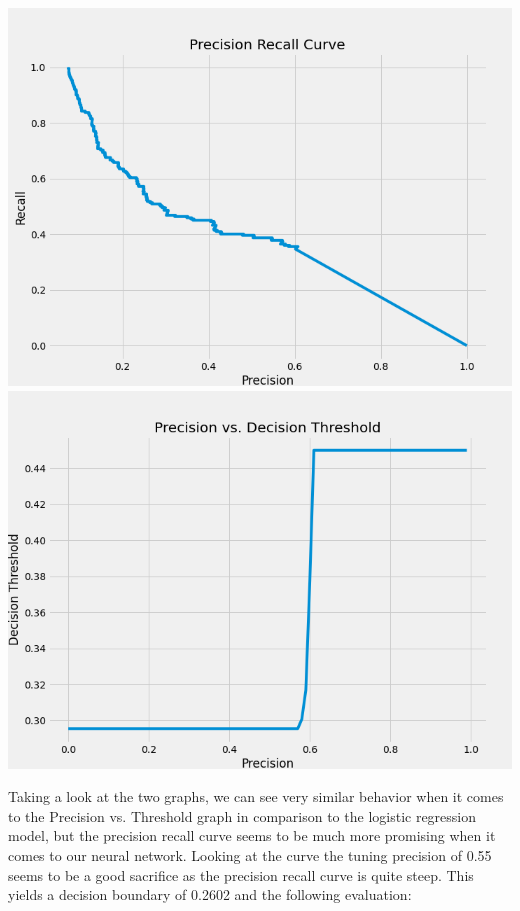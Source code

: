 \documentclass[12pt]{article}
\begin{document}
	\begin{center}
		\includegraphics[scale=0.3]{../notebooks/pr_curve_nn.png}
		\includegraphics[scale=0.3]{../notebooks/precisionvsthreshold_nn.png}
	\end{center}
	
	Taking a look at the two graphs, we can see very similar behavior when it comes to the Precision vs. Threshold graph in comparison to the logistic regression model, but the precision recall curve seems to be much more promising when it comes to our neural network. Looking at the curve the tuning precision of 0.55 seems to be a good sacrifice as the precision recall curve is quite steep. This yields a decision boundary of 0.2602 and the following evaluation: 
	
\end{document}
